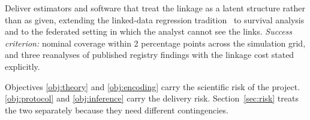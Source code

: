 Deliver estimators and software that treat the linkage as a latent structure rather than as given,
extending the linked-data regression tradition~\cite{lahiri2005regression} to survival analysis and
to the federated setting in which the analyst cannot see the links.
\emph{Success criterion:} nominal coverage within 2 percentage points across the simulation grid,
and three reanalyses of published registry findings with the linkage cost stated explicitly.

\vspace{9pt}
\noindent
Objectives \ref{obj:theory} and \ref{obj:encoding} carry the scientific risk of the project.
\ref{obj:protocol} and \ref{obj:inference} carry the delivery risk. Section~\ref{sec:risk} treats
the two separately because they need different contingencies.
